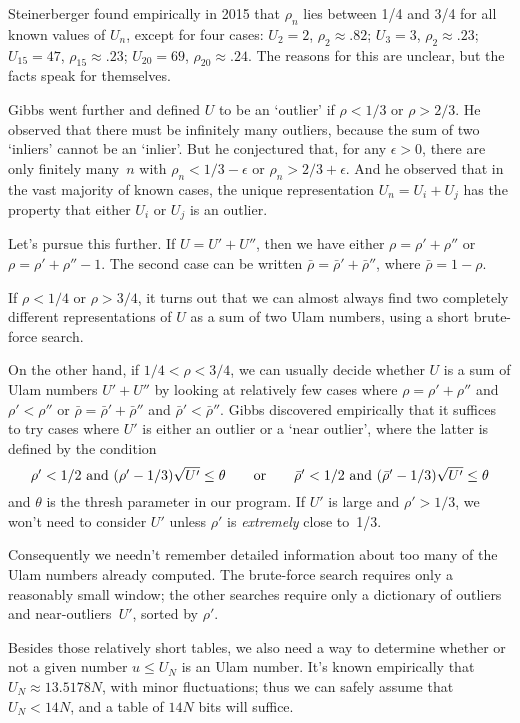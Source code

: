Steinerberger found empirically
in 2015 that $\rho_n$ lies between 1/4 and 3/4 for all known values
of $U_n$, except for four cases:
$U_2=2$, $\rho_2\approx.82$;
$U_3=3$, $\rho_2\approx.23$;
$U_{15}=47$, $\rho_{15}\approx.23$;
$U_{20}=69$, $\rho_{20}\approx.24$.
The reasons for this are unclear, but the facts speak for themselves.

Gibbs went further and defined $U$ to be an `outlier' if $\rho<1/3$
or $\rho>2/3$. He observed that there must be infinitely many outliers,
because the sum of two `inliers' cannot be an `inlier'. But he
conjectured that, for any $\epsilon>0$, there are only finitely many~$n$
with $\rho_n<1/3-\epsilon$ or $\rho_n>2/3+\epsilon$.
And he observed that in the vast majority of known cases, the unique
representation $U_n=U_i+U_j$ has the property that
either $U_i$ or $U_j$ is an outlier.

Let's pursue this further. If $U=U'+U''$, then we have either
$\rho=\rho'+\rho''$ or $\rho=\rho'+\rho''-1$. The second case can
be written $\bar\rho=\bar\rho'+\bar\rho''$, where $\bar\rho=1-\rho$.

If $\rho<1/4$ or $\rho>3/4$, it turns out that we can almost always find
two completely different representations of $U$ as a sum of two Ulam
numbers, using a short brute-force search.

On the other hand, if $1/4<\rho<3/4$,
we can usually decide whether $U$ is a sum of Ulam numbers $U'+U''$
by looking at relatively few cases where $\rho=\rho'+\rho''$
and $\rho'<\rho''$ or $\bar\rho=\bar\rho'+\bar\rho''$ and
$\bar\rho'<\bar\rho''$. Gibbs discovered empirically that it suffices to
try cases where $U'$ is either an outlier
or a `near outlier', where the latter is defined by the condition
$$
\hbox{$\rho'<1/2$ and $(\rho'-1/3)\sqrt{U'}\le\theta$}\qquad\hbox{or}\qquad
\hbox{$\bar\rho'<1/2$ and $(\bar\rho'-1/3)\sqrt{U'}\le\theta$}$$
and $\theta$ is the thresh parameter  in our program.
If $U'$ is large and $\rho'>1/3$, we won't need to consider $U'$ unless
$\rho'$ is {\it extremely\/} close to~1/3.

Consequently we needn't remember detailed information about too many
of the Ulam numbers already computed. The brute-force search requires
only a reasonably small window; the other searches require only
a dictionary of outliers and near-outliers~$U'$, sorted by $\rho'$.

\fi

Besides those relatively short tables, we also need a way to
determine whether or not a given number $u\le U_N$ is an Ulam number.
It's known empirically that $U_N\approx 13.5178N$, with minor
fluctuations; thus we can safely assume that $U_N<14N$, and
a table of $14N$ bits will suffice.

